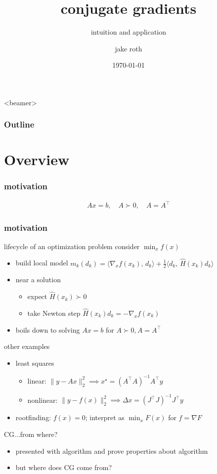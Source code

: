\documentclass[10pt,dvipsnames*]{beamer}
\title{conjugate gradients}
\subtitle{intuition and application}
\author{jake roth}
\date{\today}
\begin{document}
%
\begin{frame}[plain]
  \titlepage
\end{frame}
%
\begin{frame}<beamer>
  \frametitle{Outline}
  \tableofcontents
\end{frame}
%
\section{Overview}
\label{sec:overview}
%
\begin{frame}
  \frametitle{motivation}
  \begin{align*}
    Ax = b,\quad A \succ 0,\quad A=A^{\top}
  \end{align*}
\end{frame}
%
\begin{frame}
  \frametitle{motivation}
  \pause
  \begin{block}{lifecycle of an optimization problem}
    consider $\min_x f(x)$
    \begin{itemize}
      \item build local model $m_k(d_k) = \langle \nabla_x f(x_k),\, d_k \rangle + \tfrac 12 \langle d_k,\, \hat{H}(x_k) d_k \rangle$
      \item near a solution
      \begin{itemize}
        \item expect $\hat{H}(x_k) \succ 0$
        \item take Newton step $\hat{H}(x_k) d_k = -\nabla_x f(x_k)$
      \end{itemize}
      \item boils down to solving $Ax = b$ for $A \succ 0, A=A^{\top}$
    \end{itemize}
  \end{block}
  \pause
  \begin{block}{other examples}
    \begin{itemize}
      \item least squares
      \begin{itemize}
        \item linear: $\|y - Ax\|_2^2 \implies x^{\star} = (A^{\top}A)^{-1}A^{\top}y$
        \item nonlinear: $\|y - f(x)\|_2^2 \implies \Delta x = (J^{\top}J)^{-1}J^{\top}y$
      \end{itemize}
      \item rootfinding: $f(x) = 0$; interpret as $\min_x F(x)$ for $f = \nabla F$
    \end{itemize}
  \end{block}
  \pause
  \begin{block}{CG...from where?}
    \begin{itemize}
      \item presented with algorithm and prove properties about algorithm
      \item but where does CG \alert{come from}?
    \end{itemize}
  \end{block}
\end{frame}
\end{document}
